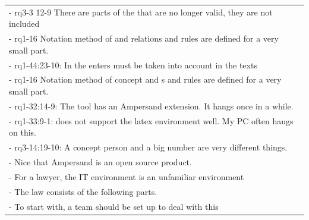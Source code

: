 \begin{xltabular}{\textwidth}{|X|}
-	rq3-3 12-9 There are parts of the  that are no longer valid, they are not included	\\
-	rq1-16 Notation method of  and {relation}s and {rule}s are defined for a very small part.	\\
-	 rq1-44:23-10: In the  enters must be taken into account in the texts	\\
-	rq1-16 Notation method of {concept} and s and {rule}s are defined for a very small part.	\\
-	 rq1-32:14-9: The tool  has an Ampersand extension.     It hangs once in a while.	\\
-	rq1-33:9-1:  does not support the {latex} environment well.     My PC often hangs on this.	\\
-	 rq3-14:19-10: A {concept} person and a big number are very different things.	\\
-	Nice that Ampersand is an open source product. 	\\
-	For a lawyer, the IT environment is an unfamiliar environment	\\
-	The law consists of the following parts.	\\
-	To start with, a team should be set up to deal with this	\\


\end{xltabular}